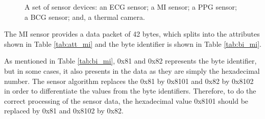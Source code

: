 \begin{figure}
	\hspace{8pt}%
	\caption[A set of sensor devices.]{A set of sensor devices:
		 an ECG sensor;
		 a MI sensor;
		 a PPG sensor;
		 a BCG sensor; and,
		 a thermal camera.}%
	\label{fig:ex3}%
\end{figure}



The MI sensor provides a data packet of 42 bytes, which splits into the attributes shown in Table \ref{tab:att_mi} and the byte identifier is shown in Table \ref{tab:bi_mi}.


As mentioned in Table \ref{tab:bi_mi}, 0x81 and 0x82 represents the byte identifier, but in some cases, it also presents in the data as they are simply the hexadecimal number. The sensor algorithm replaces the 0x81 by 0x8101 and 0x82 by 0x8102 in order to differentiate the values from the byte identifiers. Therefore, to do the correct processing of the sensor data, the hexadecimal value 0x8101 should be replaced by 0x81 and 0x8102 by 0x82.

